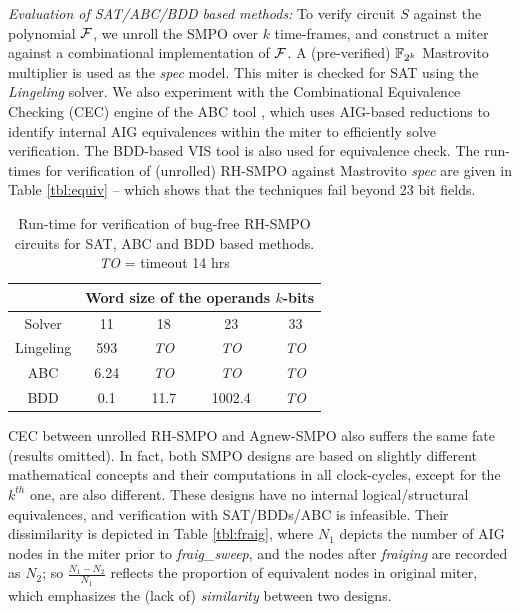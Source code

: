 {\it Evaluation of SAT/ABC/BDD based methods:} To verify circuit $S$
against the polynomial ${\mathcal{F}}$, we unroll the SMPO over $k$ time-frames,
and construct a miter against a combinational implementation of ${\mathcal{F}}$.
A (pre-verified) ${\mathbb{F}}_{2^k}$ Mastrovito multiplier \cite{mastro:1989} is
used as the {\it spec} model. This miter is checked for SAT using the
\emph{Lingeling} \cite{biere2013lingeling} solver. We also experiment
with the Combinational Equivalence Checking (CEC) engine of the ABC
tool \cite{abc}, which uses AIG-based reductions to identify internal
AIG equivalences within the miter to efficiently solve
verification. The BDD-based VIS tool \cite{brayton1996vis} is also used
for equivalence check. The run-times for verification of (unrolled)
RH-SMPO against Mastrovito {\it   spec} are given in Table
\ref{tbl:equiv} -- which shows that the techniques fail beyond 23 bit
fields.  

\vspace{-0.1in}
\begin{table}[htb]
\centering
\caption{\small Run-time for verification of bug-free RH-SMPO circuits
  for SAT, ABC and BDD based methods. \emph{TO} = timeout 14 hrs}
\label{tbl:equiv}
\begin{tabular}{|c||c|c|c|c|} 
\hline
& \multicolumn{4}{|c|}{Word size of the operands $k$-bits}  \\
\hline
Solver & 11 & 18 & 23 & 33 \\
\hline
\hline
Lingeling & 593  & \emph{TO}  & \emph{TO}  & \emph{TO}\\
\hline
\hline
ABC & 6.24 & \emph{TO} & \emph{TO} & \emph{TO}\\
\hline
\hline
BDD & 0.1 & 11.7 & 1002.4 & \emph{TO}  \\
\hline
\end{tabular}
\label{table:satbdd}  
\end{table} 

CEC between unrolled RH-SMPO and Agnew-SMPO also suffers the same fate
(results omitted). In fact, both SMPO designs are based on slightly
different mathematical concepts and their computations in all
clock-cycles, except for the $k^{th}$ one, are also different. These
designs have no internal logical/structural equivalences, and
verification with SAT/BDDs/ABC is infeasible. Their dissimilarity is
depicted in Table \ref{tbl:fraig}, where  $N_1$ depicts the number of
AIG nodes in the miter prior to {\it fraig\_sweep}, and the nodes
after {\it fraiging} are recorded as $N_2$; so $\frac{N_1-N_2}{N_1}$
reflects the proportion of equivalent nodes in original miter, which
emphasizes the (lack of) \emph{similarity} between two designs.  

